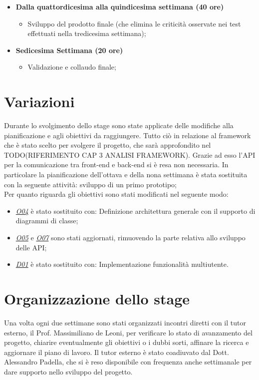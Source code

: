 \begin{itemize}
\begin{itemize}
	\end{itemize}
        
        
        \item[] \textbf{Dalla quattordicesima alla quindicesima settimana (40 ore)} 
        
	\begin{itemize}
            	\item{Sviluppo del prodotto finale (che elimina le criticità osservate nei test effettuati nella tredicesima settimana)};

	\end{itemize}

         \item[] \textbf{Sedicesima Settimana (20 ore)}   
	\begin{itemize}
            	\item{Validazione e collaudo finale};
	\end{itemize} 

 \end{itemize}


\section{Variazioni}
Durante lo svolgimento dello stage sono state applicate delle modifiche alla pianificazione e agli obiettivi da raggiungere. Tutto ciò in relazione al framework che è stato scelto per svolgere il progetto, che sarà approfondito nel TODO(RIFERIMENTO CAP 3 ANALISI FRAMEWORK). Grazie ad esso l'\gls{API} per la comunicazione tra front-end e back-end si è resa non necessaria.
In particolare la pianificazione dell'ottava e della nona settimana è stata sostituita con la seguente attività: sviluppo di un primo prototipo;
\\
Per quanto riguarda gli obiettivi sono stati modificati nel seguente modo:
	\begin{itemize}
    \item \underline{\textit{O04}} è stato sostituito con: Definizione architettura generale con il supporto di diagrammi di classe;
    \item \underline{\textit{O05}} e \underline{\textit{O07}} sono stati aggiornati, rimuovendo la parte relativa allo sviluppo delle \gls{API};
    \item \underline{\textit{D01}} è stato sostituito con: Implementazione funzionalità multiutente.
	\end{itemize}


\section{Organizzazione dello stage}
Una volta ogni due settimane sono stati organizzati incontri diretti con il tutor esterno, il Prof. Massimiliano de Leoni, per verificare lo stato di avanzamento del progetto, chiarire eventualmente gli obiettivi o i dubbi sorti, affinare la ricerca e aggiornare il piano di lavoro. Il tutor esterno è stato coadiuvato dal Dott. Alessandro Padella, che si è reso disponibile con frequenza anche settimanale per dare supporto nello sviluppo del progetto.



 

